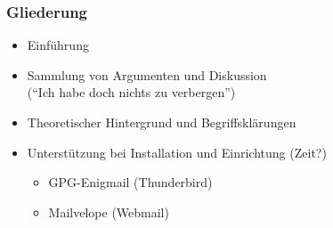 \documentclass{beamer}
\begin{document}
\begin{frame}[label=wb2]

\begin{center}
 \vspace{10mm}
\end{center}
 
\end{frame}


\begin{frame}[label=ol1]
  \frametitle{Gliederung}
  \begin{itemize}
   \item Einführung
   \item Sammlung von Argumenten und Diskussion\\
   ("`Ich habe doch nichts zu verbergen"')
   \item Theoretischer Hintergrund und Begriffsklärungen
   \item Unterstützung bei Installation und Einrichtung (Zeit?)
   \begin{itemize}
    \item GPG-Enigmail (Thunderbird)
   \item Mailvelope (Webmail)
   \end{itemize}

  \end{itemize}

\end{frame}

\end{document}
